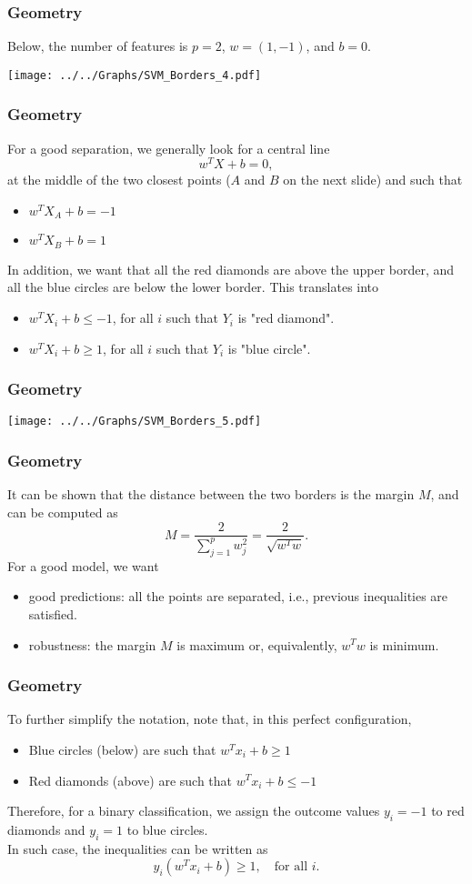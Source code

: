 \begin{frame}
\frametitle{Geometry}
Below, the number of features is $p=2$, $w=(1,-1)$, and $b=0$.
\begin{center}
\texttt{[image: ../../Graphs/SVM\_Borders\_4.pdf]}
\end{center}
\end{frame}
\begin{frame}
\frametitle{Geometry}
For a good separation, we generally look for a central line 
$$
w^TX + b = 0,
$$ 
at the middle of the two closest points ($A$ and $B$ on the next slide) and such that 
\begin{itemize}
\item $w^T X_A + b = -1$
\item $w^T X_B + b = 1$
\end{itemize}
In addition, we want that all the red diamonds are above the upper border, and all the blue circles are below the lower border. This translates into
\begin{itemize}
\item $w^T X_i + b \leq -1$, for all $i$ such that $Y_i$ is "red diamond".
\item $w^T X_i + b \geq 1$, for all $i$ such that $Y_i$ is "blue circle".
\end{itemize}
\end{frame}
\begin{frame}
\frametitle{Geometry}
\begin{center}
\texttt{[image: ../../Graphs/SVM\_Borders\_5.pdf]}
\end{center}
\end{frame}
\begin{frame}
\frametitle{Geometry}
It can be shown that the distance between the two borders is the margin $M$, and can be computed as 
$$
M=\frac{2}{\sum_{j=1}^p w_j^2}=\frac{2}{\sqrt{w^T w}}.
$$
For a good model, we want 
\begin{itemize}
\item good predictions: all the points are separated, i.e., previous inequalities are satisfied.
\item robustness: the margin $M$ is maximum or, equivalently, $w^Tw$ is minimum.
\end{itemize}
\end{frame}
\begin{frame}
\frametitle{Geometry}
To further simplify the notation, note that, in this perfect configuration, 
\begin{itemize}
\item Blue circles (below) are such that $w^T x_i + b \geq 1$
\item Red diamonds (above) are such that $w^T x_i + b \leq -1$
\end{itemize}
Therefore, for a binary classification, we assign the outcome values $y_i=-1$ to red diamonds and $y_i=1$ to blue circles. \\
\vspace{0.2cm} 
In such case, the inequalities can be written as
$$
y_i (w^T x_i + b) \geq 1, \quad \mbox{for all } i.
$$
\end{frame}
